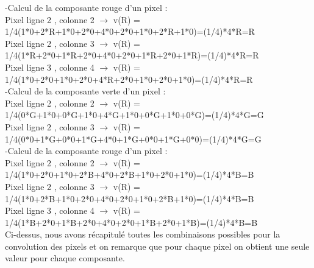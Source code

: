 \documentclass[a4paper,12pt]{report}
\begin{document}
\begin{figure}[!ht]
\end{figure}

\noindent -Calcul de la composante rouge d'un pixel :\\
Pixel ligne 2 , colonne 2 $\rightarrow$ v(R) = 1/4(1*0+2*R+1*0+2*0+4*0+2*0+1*0+2*R+1*0)=(1/4)*4*R=R\\
Pixel ligne 2 , colonne 3 $\rightarrow$ v(R) = 1/4(1*R+2*0+1*R+2*0+4*0+2*0+1*R+2*0+1*R)=(1/4)*4*R=R\\
Pixel ligne 3 , colonne 4 $\rightarrow$ v(R) = 1/4(1*0+2*0+1*0+2*0+4*R+2*0+1*0+2*0+1*0)=(1/4)*4*R=R\\

\noindent -Calcul de la composante verte d'un pixel :\\
Pixel ligne 2 , colonne 2 $\rightarrow$ v(R) = 1/4(0*G+1*0+0*G+1*0+4*G+1*0+0*G+1*0+0*G)=(1/4)*4*G=G\\
Pixel ligne 2 , colonne 3 $\rightarrow$ v(R) = 1/4(0*0+1*G+0*0+1*G+4*0+1*G+0*0+1*G+0*0)=(1/4)*4*G=G\\


\noindent -Calcul de la composante rouge d'un pixel :\\
Pixel ligne 2 , colonne 2 $\rightarrow$ v(R) = 1/4(1*0+2*0+1*0+2*B+4*0+2*B+1*0+2*0+1*0)=(1/4)*4*B=B\\
Pixel ligne 2 , colonne 3 $\rightarrow$ v(R) = 1/4(1*0+2*B+1*0+2*0+4*0+2*0+1*0+2*B+1*0)=(1/4)*4*B=B\\
Pixel ligne 3 , colonne 4 $\rightarrow$ v(R) = 1/4(1*B+2*0+1*B+2*0+4*0+2*0+1*B+2*0+1*B)=(1/4)*4*B=B\\

Ci-dessus, nous avons récapitulé toutes les combinaisons possibles pour la convolution des pixels et on remarque que pour chaque pixel on obtient une seule valeur pour chaque composante.

\newpage
\end{document}
